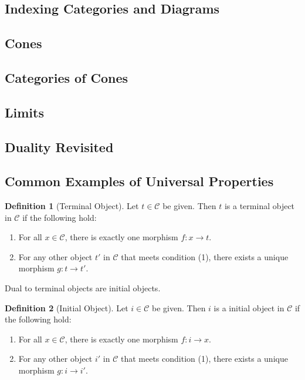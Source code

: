 \documentclass[12pt]{article}
\theoremstyle{definition}
\newtheorem{definition}{Definition}
\begin{document}
\subsection*{Indexing Categories and Diagrams}


\subsection*{Cones}


\subsection*{Categories of Cones}


\subsection*{Limits}


\subsection*{Duality Revisited}


\subsection*{Common Examples of Universal Properties}

\begin{definition}[Terminal Object]
    Let $t\in\mathcal{C}$ be given. Then $t$ is a terminal object in $\mathcal{C}$ if the following hold:
    \begin{enumerate}
        \item For all $x\in\mathcal{C}$, there is exactly one morphism $f:x\rightarrow t$.
        \item For any other object $t'$ in $\mathcal{C}$ that meets condition (1), there exists a unique morphism $g:t\rightarrow t'$.
    \end{enumerate}
\end{definition}


Dual to terminal objects are initial objects.
\begin{definition}[Initial Object]
    Let $i\in\mathcal{C}$ be given. Then $i$ is a initial object in $\mathcal{C}$ if the following hold:
    \begin{enumerate}
        \item For all $x\in\mathcal{C}$, there is exactly one morphism $f:i\rightarrow x$.
        \item For any other object $i'$ in $\mathcal{C}$ that meets condition (1), there exists a unique morphism $g:i\rightarrow i'$.
    \end{enumerate}
\end{definition}
\end{document}
